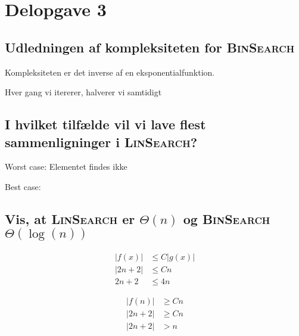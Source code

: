 \section{Delopgave 3}\label{sec:delopgave-32}

\subsection{Udledningen af kompleksiteten for \textsc{BinSearch}}
\label{subsec:udledningen-af-kompleksiteten-for-textsc{binsearch}}

Kompleksiteten er det inverse af en eksponentialfunktion.

Hver gang vi itererer, halverer vi samtidigt

\subsection{I hvilket tilfælde vil vi lave flest sammenligninger i \textsc{LinSearch}?}
\label{subsec:i-hvilket-tilflde-vil-vi-lave-flest-sammenligninger-i-textsc{linsearch}?}

Worst case: Elementet findes ikke

Best case:

\subsection{Vis, at \textsc{LinSearch} er \(\Theta\left(n\right)\) og \textsc{BinSearch} \(\Theta\left(\log\left(n
\right)\right)\)}
\label{subsec:vis-at-textsc{linsearch}-er-(thetaleft(0right))-og-textsc{binsearch}-(thetaleft(logleft(nright)right))}

\begin{equation}
    \begin{aligned}
        \lvert f(x) \rvert & \leq C \lvert g(x) \rvert \\
        \lvert 2n + 2 \rvert & \leq Cn \\
        2n + 2 & \leq 4n
    \end{aligned}\label{eq:equation13}
\end{equation}

\begin{equation}
    \begin{aligned}
        \lvert f(n) \rvert & \geq Cn \\
        \lvert 2n + 2 \rvert & \geq Cn \\
        \lvert 2n + 2 \rvert & > n
    \end{aligned}\label{eq:equation14}
\end{equation}

